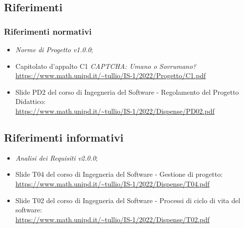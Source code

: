 \subsection{Riferimenti}

\subsubsection{Riferimenti normativi}

\begin{itemize}
	\item \textit{Norme di Progetto v1.0.0};
	\item Capitolato d'appalto C1 \textit{CAPTCHA: Umano o Sovrumano?}\\
		\url{https://www.math.unipd.it/~tullio/IS-1/2022/Progetto/C1.pdf}
	\item Slide PD2 del corso di Ingegneria del Software - Regolamento del Progetto Didattico:\\
		\url{https://www.math.unipd.it/~tullio/IS-1/2022/Dispense/PD02.pdf}
\end{itemize}

\subsection{Riferimenti informativi}
\begin{itemize}
	\item \textit{Analisi dei Requisiti v2.0.0};
	\item Slide T04 del corso di Ingegneria del Software - Gestione di progetto:\\
		\url{https://www.math.unipd.it/~tullio/IS-1/2022/Dispense/T04.pdf}
	\item Slide T02 del corso di Ingegneria del Software - Processi di ciclo di vita del software:\\
		\url{https://www.math.unipd.it/~tullio/IS-1/2022/Dispense/T02.pdf}
\end{itemize}



